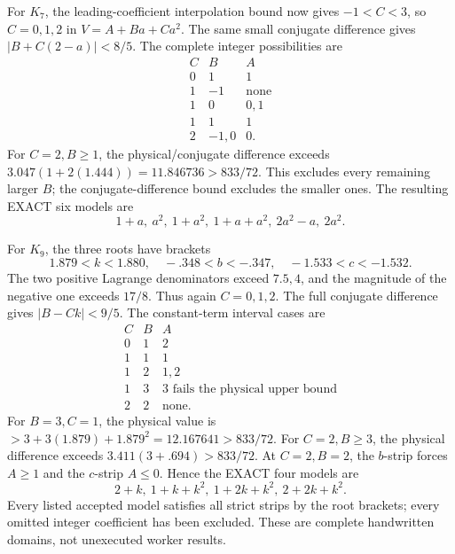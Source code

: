 \documentclass[11pt]{article}
\begin{document}
For \(K_7\), the leading-coefficient interpolation bound now
gives \(-1<C<3\), so \(C=0,1,2\) in \(V=A+Ba+Ca^2\).
The same small conjugate difference gives
\(|B+C(2-a)|<8/5\).
The complete integer possibilities are
\[
\begin{array}{c|c|c}
C&B&A\\ \hline
0&1&1\\
1&-1&\text{none}\\
1&0&0,1\\
1&1&1\\
2&-1,0&0 .
\end{array}
\]
For \(C=2,B\ge1\), the physical/conjugate difference exceeds
\(3.047(1+2(1.444))=11.846736>833/72\).
This excludes every remaining larger \(B\);
the conjugate-difference bound excludes the smaller ones.
The resulting EXACT six models are
\[
                 1+a,\ a^2,\ 1+a^2,\ 1+a+a^2,\ 2a^2-a,\ 2a^2 .
\]

For \(K_9\), the three roots have brackets
\[
 1.879<k<1.880,\quad -.348<b<-.347,\quad -1.533<c<-1.532 .
\]
The two positive Lagrange denominators exceed \(7.5,4\),
and the magnitude of the negative one exceeds \(17/8\).
Thus again \(C=0,1,2\).
The full conjugate difference gives \(|B-Ck|<9/5\).
The constant-term interval cases are
\[
\begin{array}{c|c|c}
C&B&A\\ \hline
0&1&2\\
1&1&1\\
1&2&1,2\\
1&3&3\text{ fails the physical upper bound}\\
2&2&\text{none}.
\end{array}
\]
For \(B=3,C=1\), the physical value is
\(>3+3(1.879)+1.879^2=12.167641>833/72\).
For \(C=2,B\ge3\), the physical difference exceeds
\(3.411(3+.694)>833/72\).
At \(C=2,B=2\), the \(b\)-strip forces \(A\ge1\) and
the \(c\)-strip \(A\le0\).
Hence the EXACT four models are
\[
                     2+k,\ 1+k+k^2,\ 1+2k+k^2,\ 2+2k+k^2 .
\]
Every listed accepted model satisfies all strict strips by the
root brackets; every omitted integer coefficient has been excluded.
These are complete handwritten domains, not unexecuted worker results.
\end{document}
